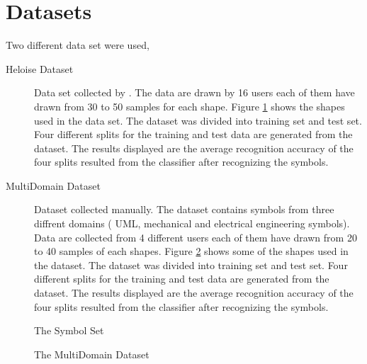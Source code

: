 \section{Datasets}
\label{sec:Datasets}
Two different data set were used, 
\begin{description}
	\item [Heloise Dataset] Data set collected by \citeauthor{HeloiseBeautification}. The data are drawn by 16 users each of them have drawn from 30 to 50 samples for each shape. Figure \ref{fig:symbolSet} shows the shapes used in the data set. The dataset was divided into training set and test set. Four different splits for the training and test data are generated from the dataset. The results displayed are the average recognition accuracy of the four splits resulted from the classifier after recognizing the symbols.
		\item [MultiDomain Dataset] Dataset collected manually. The dataset contains symbols from three diffrent domains ( UML, mechanical and electrical engineering symbols). Data are collected from 4 different users each of them have drawn from 20 to 40 samples of each shapes. Figure \ref{fig:MultisymbolSet} shows some of the shapes used in the dataset. The dataset was divided into training set and test set. Four different splits for the training and test data are generated from the dataset. The results displayed are the average recognition accuracy of the four splits resulted from the classifier after recognizing the symbols. 
\end{description}
\begin{figure}[]\centering
{}
	\caption{The Symbol Set}
	\label{fig:symbolSet}
\end{figure}

\begin{figure}[]\centering
{}
	\caption{The MultiDomain Dataset }
	\label{fig:MultisymbolSet}
\end{figure}

